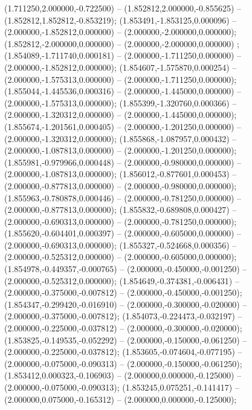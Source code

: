  (1.711250,2.000000,-0.722500) -- (1.852812,2.000000,-0.855625) -- (1.852812,1.852812,-0.853219);
 (1.853491,-1.853125,0.000096) -- (2.000000,-1.852812,0.000000) -- (2.000000,-2.000000,0.000000);
 (1.852812,-2.000000,0.000000) -- (2.000000,-2.000000,0.000000) ;
 (1.854089,-1.711740,0.000181) -- (2.000000,-1.711250,0.000000) -- (2.000000,-1.852812,0.000000);
 (1.854607,-1.575870,0.000254) -- (2.000000,-1.575313,0.000000) -- (2.000000,-1.711250,0.000000);
 (1.855044,-1.445536,0.000316) -- (2.000000,-1.445000,0.000000) -- (2.000000,-1.575313,0.000000);
 (1.855399,-1.320760,0.000366) -- (2.000000,-1.320312,0.000000) -- (2.000000,-1.445000,0.000000);
 (1.855674,-1.201561,0.000405) -- (2.000000,-1.201250,0.000000) -- (2.000000,-1.320312,0.000000);
 (1.855868,-1.087957,0.000432) -- (2.000000,-1.087813,0.000000) -- (2.000000,-1.201250,0.000000);
 (1.855981,-0.979966,0.000448) -- (2.000000,-0.980000,0.000000) -- (2.000000,-1.087813,0.000000);
 (1.856012,-0.877601,0.000453) -- (2.000000,-0.877813,0.000000) -- (2.000000,-0.980000,0.000000);
 (1.855963,-0.780878,0.000446) -- (2.000000,-0.781250,0.000000) -- (2.000000,-0.877813,0.000000);
 (1.855832,-0.689808,0.000427) -- (2.000000,-0.690313,0.000000) -- (2.000000,-0.781250,0.000000);
 (1.855620,-0.604401,0.000397) -- (2.000000,-0.605000,0.000000) -- (2.000000,-0.690313,0.000000);
 (1.855327,-0.524668,0.000356) -- (2.000000,-0.525312,0.000000) -- (2.000000,-0.605000,0.000000);
 (1.854978,-0.449357,-0.000765) -- (2.000000,-0.450000,-0.001250) -- (2.000000,-0.525312,0.000000);
 (1.854649,-0.374381,-0.006431) -- (2.000000,-0.375000,-0.007812) -- (2.000000,-0.450000,-0.001250);
 (1.854347,-0.299420,-0.016910) -- (2.000000,-0.300000,-0.020000) -- (2.000000,-0.375000,-0.007812);
 (1.854073,-0.224473,-0.032197) -- (2.000000,-0.225000,-0.037812) -- (2.000000,-0.300000,-0.020000);
 (1.853825,-0.149535,-0.052292) -- (2.000000,-0.150000,-0.061250) -- (2.000000,-0.225000,-0.037812);
 (1.853605,-0.074604,-0.077195) -- (2.000000,-0.075000,-0.090313) -- (2.000000,-0.150000,-0.061250);
 (1.853412,0.000323,-0.106903) -- (2.000000,0.000000,-0.125000) -- (2.000000,-0.075000,-0.090313);
 (1.853245,0.075251,-0.141417) -- (2.000000,0.075000,-0.165312) -- (2.000000,0.000000,-0.125000);

